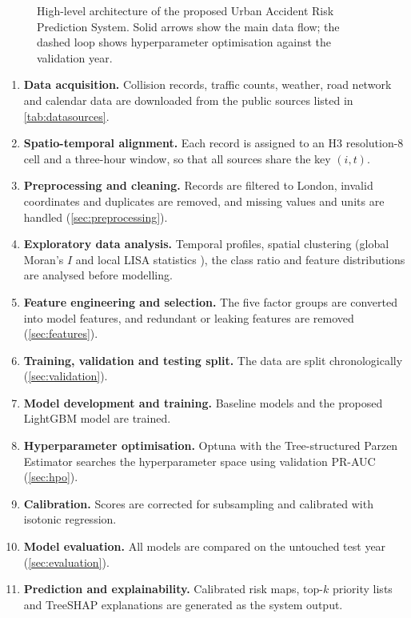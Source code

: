 \begin{figure}[t]
\centering

\caption{High-level architecture of the proposed Urban Accident Risk Prediction System. Solid arrows show the main data flow; the dashed loop shows hyperparameter optimisation against the validation year.}
\label{fig:architecture}
\end{figure}

\begin{enumerate}[label=\arabic*.]
\item \textbf{Data acquisition.} Collision records, traffic counts, weather, road network and calendar data are downloaded from the public sources listed in \cref{tab:datasources}.
\item \textbf{Spatio-temporal alignment.} Each record is assigned to an H3 resolution-8 cell and a three-hour window, so that all sources share the key $(i,t)$.
\item \textbf{Preprocessing and cleaning.} Records are filtered to London, invalid coordinates and duplicates are removed, and missing values and units are handled (\cref{sec:preprocessing}).
\item \textbf{Exploratory data analysis.} Temporal profiles, spatial clustering (global Moran's $I$ \cite{moran1950notes} and local LISA statistics \cite{anselin1995lisa}), the class ratio and feature distributions are analysed before modelling.
\item \textbf{Feature engineering and selection.} The five factor groups are converted into model features, and redundant or leaking features are removed (\cref{sec:features}).
\item \textbf{Training, validation and testing split.} The data are split chronologically (\cref{sec:validation}).
\item \textbf{Model development and training.} Baseline models and the proposed LightGBM model are trained.
\item \textbf{Hyperparameter optimisation.} Optuna with the Tree-structured Parzen Estimator searches the hyperparameter space using validation PR-AUC (\cref{sec:hpo}).
\item \textbf{Calibration.} Scores are corrected for subsampling and calibrated with isotonic regression.
\item \textbf{Model evaluation.} All models are compared on the untouched test year (\cref{sec:evaluation}).
\item \textbf{Prediction and explainability.} Calibrated risk maps, top-$k$ priority lists and TreeSHAP explanations are generated as the system output.
\end{enumerate}

